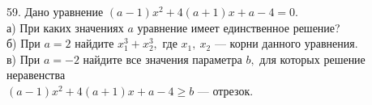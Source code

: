 59. Дано уравнение $(a-1)x^2+4(a+1)x+a-4=0.$\\
а) При каких значениях $a$ уравнение имеет единственное решение?\\
б) При $a=2$ найдите $x_1^3+x_2^3,$ где $x_1,\ x_2$ --- корни данного уравнения.\\
в) При $a=-2$ найдите все значения параметра $b,$ для которых решение неравенства\\ $(a-1)x^2+4(a+1)x+a-4\geqslant b$ --- отрезок.\\
